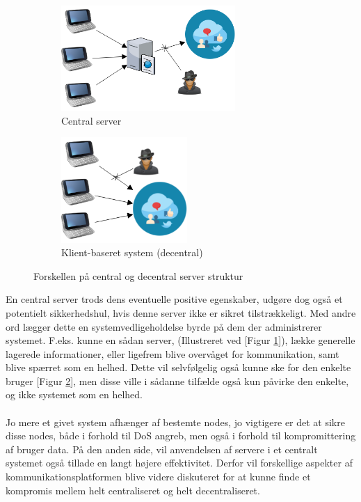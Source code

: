 \begin{figure}[H]
    \begin{subfigure}{0.5\textwidth}
        \centering
        \includegraphics[width=1\linewidth, height=4cm]{Projectdoc/Assets/Illustrationer/Security_diagram_1.png} 
        \caption{Central server}
        \label{fig:central_server}
    \end{subfigure}
    \begin{subfigure}{0.5\textwidth}
        \centering
        \includegraphics[width=0.7\linewidth, height=4cm]{Projectdoc/Assets/Illustrationer/Security_diagram_2.png}
        \caption{Klient-baseret system (decentral)}
        \label{fig:decentral_server}
    \end{subfigure}
    \caption{Forskellen på central og decentral server struktur}
    \label{fig:serverstruktur}
\end{figure}

En central server trods dens eventuelle positive egenskaber, udgøre dog også et potentielt sikkerhedshul, hvis denne server ikke er sikret tilstrækkeligt. Med andre ord lægger dette en systemvedligeholdelse byrde på dem der administrerer systemet. F.eks. kunne en sådan server, (Illustreret ved [Figur \ref{fig:central_server}]), lække generelle lagerede informationer, eller ligefrem blive overvåget for kommunikation, samt blive spærret som en helhed. Dette vil selvfølgelig også kunne ske for den enkelte bruger [Figur \ref{fig:decentral_server}], men disse ville i sådanne tilfælde også kun påvirke den enkelte, og ikke systemet som en helhed.
\\\\
Jo mere et givet system afhænger af bestemte nodes, jo vigtigere er det at sikre disse nodes, både i forhold til DoS angreb, men også i forhold til kompromittering af bruger data. På den anden side, vil anvendelsen af servere i et centralt systemet også tillade en langt højere effektivitet. Derfor vil forskellige aspekter af kommunikationsplatformen blive videre diskuteret for at kunne finde et kompromis mellem helt centraliseret og helt decentraliseret.\\

